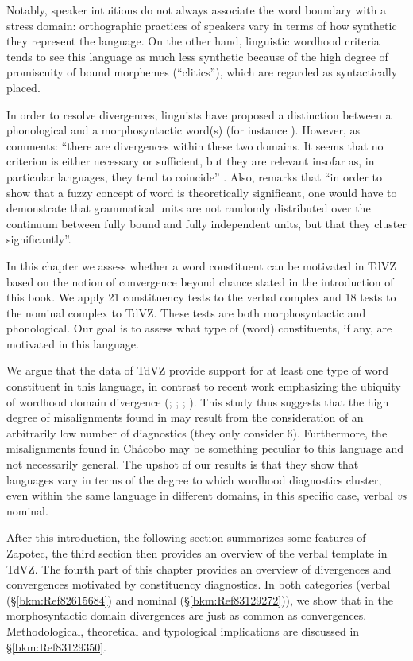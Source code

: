 \documentclass[output=paper]{langscibook}
\begin{document}
Notably, speaker intuitions do not always associate the word boundary with a stress domain: orthographic practices of speakers vary in terms of how synthetic they represent the language. On the other hand, linguistic wordhood criteria tends to see this language as much less synthetic because of the high degree of promiscuity of bound morphemes (“clitics”), which are regarded as syntactically placed. 

In order to resolve divergences, linguists have proposed a distinction between a phonological and a morphosyntactic word(s) (for instance \citealt{dixonaikhenvaldword:2002}). However, as \citet{Matthews2002} comments: “there are divergences within these two domains. It seems that no criterion is either necessary or sufficient, but they are relevant insofar as, in particular languages, they tend to coincide” \citep[274]{Matthews2002}. Also, \citet{Haspelmath2011} remarks that “in order to show that a fuzzy concept of word is theoretically significant, one would have to demonstrate that grammatical units are not randomly distributed over the continuum between fully bound and fully independent units, but that they cluster significantly”.

In this chapter we assess whether a word constituent can be motivated in TdVZ based on the notion of convergence beyond chance stated in the introduction of this book. We apply 21 constituency tests to the verbal complex and 18 tests to the nominal complex to TdVZ. These tests are both morphosyntactic and phonological. Our goal is to assess what type of (word) constituents, if any, are motivated in this language. 

We argue that the data of TdVZ provide support for at least one type of word constituent in this language, in contrast to recent work emphasizing the ubiquity of wordhood domain divergence (\citealt{Schiering2010}; \citealt{Haspelmath2011}; \citealt{Bickel2017}; \citealt{Tallman2020}). This study thus suggests that the high degree of misalignments found in \citet{Bickel2017} may result from the consideration of an arbitrarily low number of diagnostics (they only consider 6). Furthermore, the misalignments found in Chácobo \citep{Tallman2021} may be something peculiar to this language and not necessarily general. The upshot of our results is that they show that languages vary in terms of the degree to which wordhood diagnostics cluster, even within the same language in different domains, in this specific case, verbal \textit{vs} nominal.

After this introduction, the following section summarizes some features of Zapotec, the third section then provides an overview of the verbal template in TdVZ. The fourth part of this chapter provides an overview of divergences and convergences motivated by constituency diagnostics. In both categories (verbal (§\ref{bkm:Ref82615684}) and nominal (§\ref{bkm:Ref83129272})), we show that in the morphosyntactic domain divergences are just as common as convergences. Methodological, theoretical and typological implications are discussed in §\ref{bkm:Ref83129350}.
\end{document}
